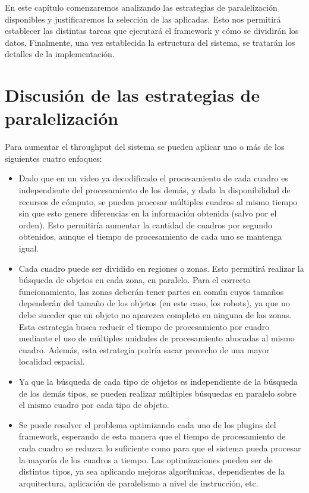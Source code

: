 
En este capítulo comenzaremos analizando las estrategias de paralelización
disponibles y justificaremos la selección de las aplicadas. Esto nos permitirá
establecer las distintas tareas que ejecutará el framework y cómo se dividirán
los datos. Finalmente, una vez establecida la estructura del sistema, se
tratarán los detalles de la implementación.

\section{Discusión de las estrategias de paralelización}

\label{descripcionSistema}

Para aumentar el throughput del sistema se pueden aplicar uno o más de los
siguientes cuatro enfoques:

\begin{itemize}

	\item	Dado que en un video ya decodificado el procesamiento de cada
		cuadro es independiente del procesamiento de los demás, y dada
		la disponibilidad de recursos de cómputo, se pueden procesar
		múltiples cuadros al mismo tiempo sin que esto genere
		diferencias en la información obtenida (salvo por el orden).
		Esto permitiría aumentar la cantidad de cuadros por segundo
		obtenidos, aunque el tiempo de procesamiento de cada uno se
		mantenga igual.

	\item	Cada cuadro puede ser dividido en regiones o zonas. Esto
		permitirá realizar la búsqueda de objetos en cada zona, en
		paralelo.
		Para el correcto funcionamiento, las zonas deberán
		tener partes en común cuyos tamaños dependerán del tamaño de los
		objetos (en este caso, los robots), ya que no debe suceder que
		un objeto no aparezca completo en ninguna de las zonas. Esta
		estrategia busca reducir el tiempo de procesamiento por cuadro
		mediante el uso de múltiples unidades de procesamiento abocadas
		al mismo cuadro. Además, esta estrategia podría sacar provecho
		de una mayor localidad espacial.

	\item	Ya que la búsqueda de cada tipo de objetos es independiente de
		la búsqueda de los demás tipos, se pueden realizar múltiples
		búsquedas en paralelo sobre el mismo cuadro por cada tipo de
		objeto.

	\item	Se puede resolver el problema optimizando cada uno de los
		plugins del framework, esperando de esta manera que el tiempo de
		procesamiento de cada cuadro se reduzca lo suficiente como para
		que el sistema pueda procesar la mayoría de los cuadros a
		tiempo. Las optimizaciones pueden ser de distintos tipos, ya sea
		aplicando mejoras algorítmicas, dependientes de la arquitectura,
		aplicación de paralelismo a nivel de instrucción, etc.

\end{itemize}

